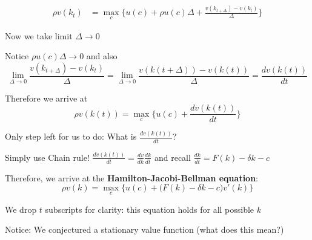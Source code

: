 \documentclass[11pt, aspectratio=169]{beamer}
\newenvironment{witemize}{\itemize\addtolength{\itemsep}{10pt}}{\enditemize}
\begin{document}
\begin{frame}{}
\begin{align*}
	\rho v(k_t) &= \max_c \Big\{ u(c) + \rho u(c) \Delta + \frac{v(k_{t+\Delta}) - v(k_t)}{\Delta} \Big\}
\end{align*}

\vspace{4mm}
\begin{witemize}
\item Now we take limit $\Delta \to 0$ 

\item Notice $\rho u(c) \Delta \to 0$ and also
\begin{equation*}
	\lim_{\Delta \to 0} \frac{v(k_{t+\Delta}) - v(k_t)}{\Delta} =
	\lim_{\Delta \to 0} \frac{v(k(t+\Delta)) - v(k(t))}{\Delta} =
	\frac{d v(k(t))}{dt}
\end{equation*}

\item Therefore we arrive at
\begin{equation*}
	\rho v(k(t)) = \max_c \Big\{ u(c) + \frac{dv(k(t))}{dt} \Big\}
\end{equation*}
\end{witemize}
\end{frame}



\begin{frame}{}
\begin{witemize}
\item Only step left for us to do: What is $\frac{dv(k(t))}{dt}$?

\item Simply use Chain rule! $\frac{dv(k(t))}{dt} = \frac{dv}{dk} \frac{dk}{dt}$ and recall $\frac{dk}{dt} = F(k) - \delta k - c$

\item Therefore, we arrive at the \textbf{Hamilton-Jacobi-Bellman equation}:
\begin{equation*}
	\rho v(k) = \max_c \Big\{ u(c) + \Big( F(k) - \delta k - c \Big) v'(k) \Big\}
\end{equation*}

\item We drop $t$ subscripts for clarity: this equation holds for all possible $k$

\item Notice: We conjectured a stationary value function (what does this mean?)
\end{witemize}
\end{frame}
\end{document}
